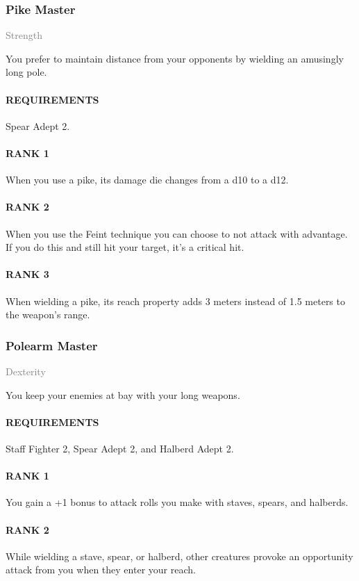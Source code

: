 \subsubsection{Pike Master} \label{feat::pikemaster}
\small{\textcolor{gray}{Strength}}

\normalsize
You prefer to maintain distance from your opponents by wielding an amusingly long pole.
\paragraph{REQUIREMENTS} Spear Adept 2.
\paragraph{RANK 1} When you use a pike, its damage die changes from a d10 to a d12.
\paragraph{RANK 2} When you use the Feint technique you can choose to not attack with advantage.
If you do this and still hit your target, it's a critical hit.
\paragraph{RANK 3} When wielding a pike, its reach property adds 3 meters instead of 1.5 meters to the weapon's range.

\subsubsection{Polearm Master} \label{feat::polerarmmaster} %
\small{\textcolor{gray}{Dexterity}}

\normalsize
You keep your enemies at bay with your long weapons.
\paragraph{REQUIREMENTS} Staff Fighter 2, Spear Adept 2, and Halberd Adept 2.
\paragraph{RANK 1} You gain a +1 bonus to attack rolls you make with staves, spears, and halberds.
\paragraph{RANK 2} While wielding a stave, spear, or halberd, other creatures provoke an opportunity attack from you when they enter your reach.
